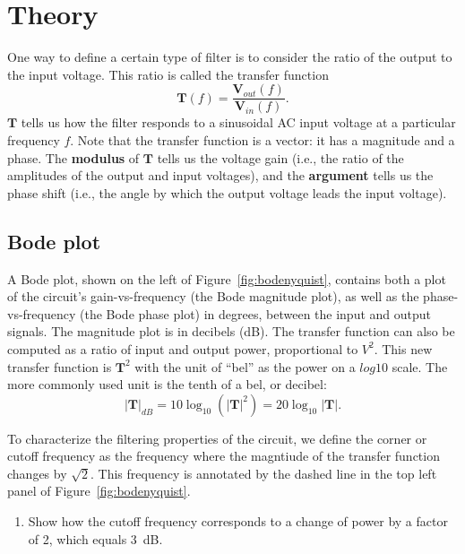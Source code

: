 \documentclass{article}
\begin{document}
\section*{Theory}
One way to define a certain type of filter is to consider the ratio of
the output to the input voltage. This ratio is called the transfer
function
\begin{equation}
  \mathbf{T}(f)=\frac{\mathbf{V}_{out}(f)}{\mathbf{V}_{in}(f)}.
\end{equation}
$\mathbf{T}$ tells us how the filter responds to a sinusoidal AC input
voltage at a particular frequency $f$. Note that the transfer function
is a vector: it has a magnitude and a phase.  The \textbf{modulus} of
$\mathbf{T}$ tells us the voltage gain (i.e., the ratio of the
amplitudes of the output and input voltages), and the
\textbf{argument} tells us the phase shift (i.e., the angle by which
the output voltage leads the input voltage).

\subsection*{Bode plot}
A Bode plot, shown on the left of Figure~\ref{fig:bodenyquist},
contains both a plot of the circuit's gain-vs-frequency (the Bode
magnitude plot), as well as the phase-vs-frequency (the Bode phase
plot) in degrees, between the input and output signals. The magnitude
plot is in decibels (dB).  The transfer function can also be computed
as a ratio of input and output power, proportional to $V^2$. This new
transfer function is $\mathbf{T}^2$ with the unit of ``bel'' as the
power on a $log10$ scale. The more commonly used unit is the tenth of
a bel, or decibel:
\begin{equation}
  |\mathbf{T}|_{dB}=
  10\log_{10}\left(|\mathbf{T}|^2\right) = 20\log_{10}|\mathbf{T}|.
\end{equation}

To characterize the filtering properties of the circuit, we define the
corner or cutoff frequency as the frequency where the magntiude of the
transfer function changes by $\sqrt{2}$. This frequency is annotated
by the dashed line in the top left panel of
Figure~\ref{fig:bodenyquist}.

\begin{enumerate}
\item Show how the cutoff frequency corresponds to a change of power
  by a factor of 2, which equals 3~dB.
\end{enumerate}
\end{document}
